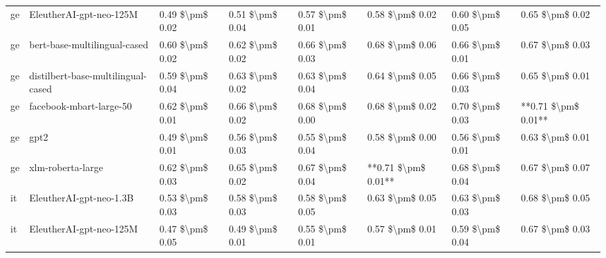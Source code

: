 \begin{tabular}{llllllll}
      ge &            EleutherAI-gpt-neo-125M & 0.49 \$\textbackslash pm\$ 0.02 &           0.51 \$\textbackslash pm\$ 0.04 &       0.57 \$\textbackslash pm\$ 0.01 &        0.58 \$\textbackslash pm\$ 0.02 &                         0.60 \$\textbackslash pm\$ 0.05 &     0.65 \$\textbackslash pm\$ 0.02 \\
      ge &       bert-base-multilingual-cased & 0.60 \$\textbackslash pm\$ 0.02 &           0.62 \$\textbackslash pm\$ 0.02 &       0.66 \$\textbackslash pm\$ 0.03 &        0.68 \$\textbackslash pm\$ 0.06 &                         0.66 \$\textbackslash pm\$ 0.01 &     0.67 \$\textbackslash pm\$ 0.03 \\
      ge & distilbert-base-multilingual-cased & 0.59 \$\textbackslash pm\$ 0.04 &           0.63 \$\textbackslash pm\$ 0.02 &       0.63 \$\textbackslash pm\$ 0.04 &        0.64 \$\textbackslash pm\$ 0.05 &                         0.66 \$\textbackslash pm\$ 0.03 &     0.65 \$\textbackslash pm\$ 0.01 \\
      ge &            facebook-mbart-large-50 & 0.62 \$\textbackslash pm\$ 0.01 &           0.66 \$\textbackslash pm\$ 0.02 &       0.68 \$\textbackslash pm\$ 0.00 &        0.68 \$\textbackslash pm\$ 0.02 &                         0.70 \$\textbackslash pm\$ 0.03 & **0.71 \$\textbackslash pm\$ 0.01** \\
      ge &                               gpt2 & 0.49 \$\textbackslash pm\$ 0.01 &           0.56 \$\textbackslash pm\$ 0.03 &       0.55 \$\textbackslash pm\$ 0.04 &        0.58 \$\textbackslash pm\$ 0.00 &                         0.56 \$\textbackslash pm\$ 0.01 &     0.63 \$\textbackslash pm\$ 0.01 \\
      ge &                  xlm-roberta-large & 0.62 \$\textbackslash pm\$ 0.03 &           0.65 \$\textbackslash pm\$ 0.02 &       0.67 \$\textbackslash pm\$ 0.04 &    **0.71 \$\textbackslash pm\$ 0.01** &                         0.68 \$\textbackslash pm\$ 0.04 &     0.67 \$\textbackslash pm\$ 0.07 \\
      it &            EleutherAI-gpt-neo-1.3B & 0.53 \$\textbackslash pm\$ 0.03 &           0.58 \$\textbackslash pm\$ 0.03 &       0.58 \$\textbackslash pm\$ 0.05 &        0.63 \$\textbackslash pm\$ 0.05 &                         0.63 \$\textbackslash pm\$ 0.03 &     0.68 \$\textbackslash pm\$ 0.05 \\
      it &            EleutherAI-gpt-neo-125M & 0.47 \$\textbackslash pm\$ 0.05 &           0.49 \$\textbackslash pm\$ 0.01 &       0.55 \$\textbackslash pm\$ 0.01 &        0.57 \$\textbackslash pm\$ 0.01 &                         0.59 \$\textbackslash pm\$ 0.04 &     0.67 \$\textbackslash pm\$ 0.03 \\

\end{tabular}
